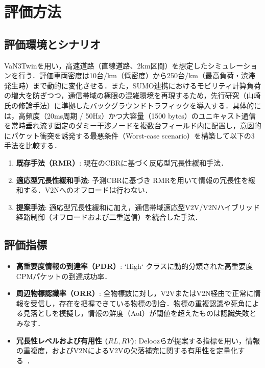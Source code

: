 \documentclass[a4paper,10pt,twocolumn,uplatex]{jsarticle}
\begin{document}
\section{評価方法}
\subsection{評価環境とシナリオ}
VaN3Twinを用い，高速道路（直線道路、2km区間）を想定したシミュレーションを行う．評価車両密度は10台/km（低密度）から250台/km（最高負荷・渋滞発生時）まで動的に変化させる．また，SUMO連携におけるモビリティ計算負荷の増大を防ぎつつ，通信帯域の極限の混雑環境を再現するため，先行研究（山崎氏の修論手法）に準拠したバックグラウンドトラフィックを導入する．具体的には，高頻度（20ms周期 / 50Hz）かつ大容量（1500 bytes）のユニキャスト通信を常時垂れ流す固定のダミー干渉ノードを複数台フィールド内に配置し，意図的にパケット衝突を誘発する最悪条件（Worst-case scenario）を構築して以下の3手法を比較する．
\begin{enumerate}
    \item \textbf{既存手法（RMR）}: 現在のCBRに基づく反応型冗長性緩和手法．
    \item \textbf{適応型冗長性緩和手法}: 予測CBRに基づき RMRを用いて情報の冗長性を緩和する．V2Nへのオフロードは行わない．
    \item \textbf{提案手法}: 適応型冗長性緩和に加え，通信帯域適応型V2V/V2Nハイブリッド経路制御（オフロードおよび二重送信）を統合した手法．
\end{enumerate}

\subsection{評価指標}
\begin{itemize}
    \item \textbf{高重要度情報の到達率（PDR）}: `High` クラスに動的分類された高重要度CPMパケットの到達成功率．
    \item \textbf{周辺物標認識率（ORR）}: 全物標数に対し，V2VまたはV2N経由で正常に情報を受信し，存在を把握できている物標の割合．物標の重複認識や死角による見落としを模擬し，情報の鮮度（AoI）が閾値を超えたものは認識失敗とみなす．
    \item \textbf{冗長性レベルおよび有用性 ($RL, RV$)}: Deloozらが提案する指標を用い，情報の重複度，およびV2NによるV2Vの欠落補完に関する有用性を定量化する~\cite{delooz}．
\end{itemize}
\end{document}
